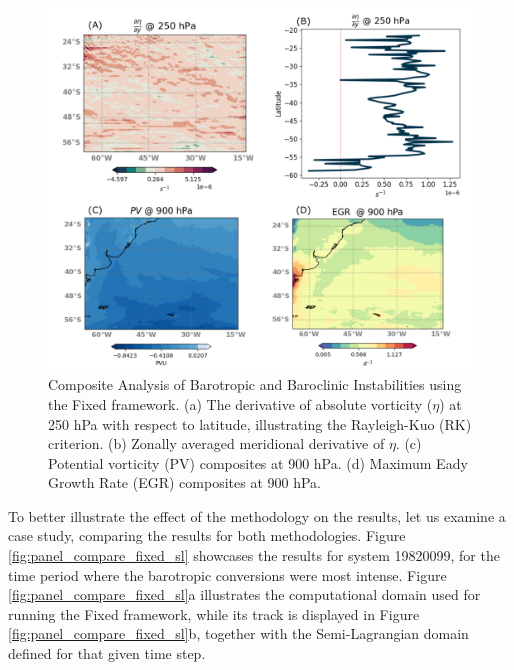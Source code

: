 \begin{figure}[!htbp]
    \centering
    \includegraphics[width=\textwidth]{figs_6/ibc_ibt_panel_fixed.pdf}
    \caption[Rayleigh Criterion and EGR - Fixed Framework]{Composite Analysis of Barotropic and Baroclinic Instabilities using the Fixed framework. (a) The derivative of absolute vorticity ($\eta$) at 250 hPa with respect to latitude, illustrating the Rayleigh-Kuo (RK) criterion. (b) Zonally averaged meridional derivative of $\eta$. (c) Potential vorticity (PV) composites at 900 hPa. (d) Maximum Eady Growth Rate (EGR) composites at 900 hPa.}
    \label{fig:ibc_ibt_panel_fixed}
\end{figure}

To better illustrate the effect of the methodology on the results, let us examine a case study, comparing the results for both methodologies. Figure \ref{fig:panel_compare_fixed_sl} showcases the results for system 19820099, for the time period where the barotropic conversions were most intense. Figure \ref{fig:panel_compare_fixed_sl}a illustrates the computational domain used for running the Fixed framework, while its track is displayed in Figure \ref{fig:panel_compare_fixed_sl}b, together with the Semi-Lagrangian domain defined for that given time step.

